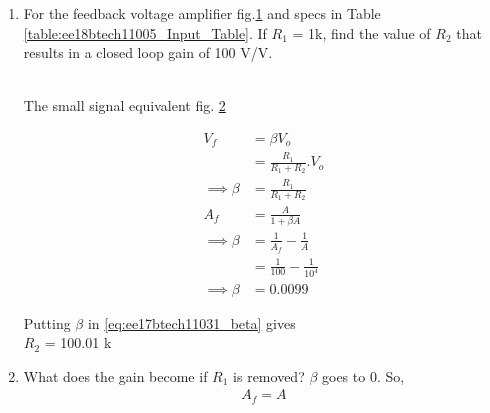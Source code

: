 \begin{enumerate}[label=\thesection.\arabic*.,ref=\thesection.\theenumi]
\item For the feedback voltage amplifier fig.\ref{fig:Original ckt} and specs in Table \ref{table:ee18btech11005_Input_Table}. If $R_{1}$ = 1k\ohm , find the value of $R_{2}$ that results in a closed loop gain of 100 V/V.

\begin{figure}[!ht]
	\begin{center}
			\resizebox{\columnwidth}{!}{}
	\end{center}
\caption{}
\label{fig:Original ckt}
\end{figure}

\begin{table}[!ht]
\centering

\caption{}
\label{table:ee18btech11005_Input_Table}
\end{table}

\\
\solution The small signal equivalent fig. \ref{fig:small ckt}
\begin{figure}[!ht]
	\begin{center}
			\resizebox{\columnwidth}{!}{}
	\end{center}
\caption{}
\label{fig:small ckt}
\end{figure}

\begin{align}
V_{f} &= \beta V_{o}\\ 
&= \frac{R_{1}}{R_{1}+R_{2}}.V_{o}\\
 \implies \beta &= \frac{R_{1}}{R_{1}+R_{2}}
\label{eq:ee17btech11031_beta}\\
A_{f} &= \frac{A}{1+\beta A}\\
\implies \beta &= \frac{1}{A_{f}} - \frac{1}{A}\\
&= \frac{1}{100} - \frac{1}{10^4}\\
\implies \beta &= 0.0099
\end{align}

Putting $\beta$ in \eqref{eq:ee17btech11031_beta} gives\\
\implies $R_2$ = 100.01 k\ohm

\item What does the gain become if $R_1$ is removed?
\solution $\beta$ goes to 0. So,
\begin{align}
    A_{f} = A
\end{align}
\end{enumerate}
